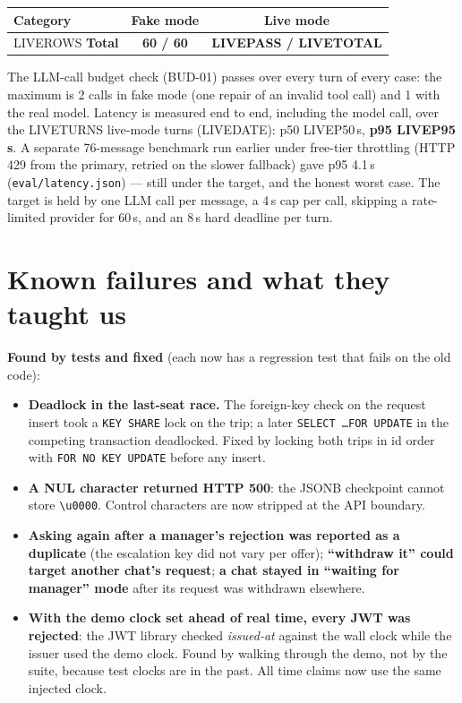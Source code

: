 \documentclass[10.5pt,a4paper]{article}
\newcommand{\livepass}{LIVEPASS}
\newcommand{\livetotal}{LIVETOTAL}
\newcommand{\livepfifty}{LIVEP50}
\newcommand{\liveninetyfive}{LIVEP95}
\newcommand{\liveturns}{LIVETURNS}
\newcommand{\livedate}{LIVEDATE}
\begin{document}
\begin{center}
\begin{tabular}{lcc}
\toprule
\textbf{Category} & \textbf{Fake mode} & \textbf{Live mode} \\
\midrule
LIVEROWS
\midrule
\textbf{Total} & \textbf{60 / 60} & \textbf{\livepass{} / \livetotal{}} \\
\bottomrule
\end{tabular}
\end{center}

The LLM-call budget check (BUD-01) passes over every turn of every case: the maximum is 2 calls in fake mode
(one repair of an invalid tool call) and 1 with the real model. Latency is measured end to end, including the model call, over the \liveturns{} live-mode turns
(\livedate{}): p50 \livepfifty{}\,s, \textbf{p95 \liveninetyfive{}\,s}. A separate 76-message benchmark run earlier
under free-tier throttling (HTTP 429 from the primary, retried on the slower fallback) gave p95 4.1\,s
(\texttt{eval/latency.json}) --- still under the target, and the honest worst case. The target is held by one LLM call
per message, a 4\,s cap per call, skipping a rate-limited provider for 60\,s, and an 8\,s hard deadline per turn.

\section{Known failures and what they taught us}

\textbf{Found by tests and fixed} (each now has a regression test that fails on the old code):
\begin{itemize}
\item \textbf{Deadlock in the last-seat race.} The foreign-key check on the request insert took a \texttt{KEY SHARE}
  lock on the trip; a later \texttt{SELECT \ldots FOR UPDATE} in the competing transaction deadlocked. Fixed by locking
  both trips in id order with \texttt{FOR NO KEY UPDATE} before any insert.
\item \textbf{A NUL character returned HTTP 500}: the JSONB checkpoint cannot store \texttt{\textbackslash u0000}.
  Control characters are now stripped at the API boundary.
\item \textbf{Asking again after a manager's rejection was reported as a duplicate} (the escalation key did not vary
  per offer); \textbf{``withdraw it'' could target another chat's request}; \textbf{a chat stayed in ``waiting for
  manager'' mode} after its request was withdrawn elsewhere.
\item \textbf{With the demo clock set ahead of real time, every JWT was rejected}: the JWT library checked
  \emph{issued-at} against the wall clock while the issuer used the demo clock. Found by walking through the demo,
  not by the suite, because test clocks are in the past. All time claims now use the same injected clock.
\end{itemize}
\end{document}
